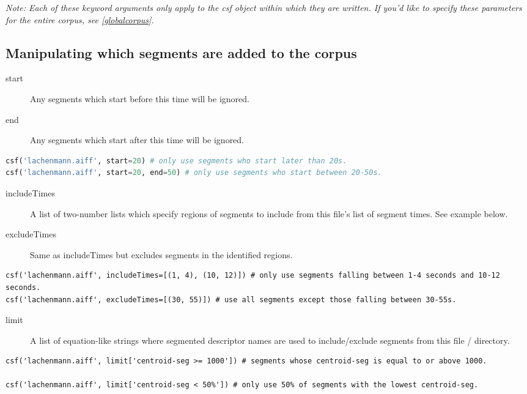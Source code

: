 \documentclass{article}
\begin{document}
\begin{spacing}{1.2}
\emph{Note: Each of these keyword arguments only apply to the csf object within which they are written.  If you'd like to specify these parameters for the entire corpus, see \ref{globalcorpus}.}

\subsection{Manipulating which segments are added to the corpus}
\begin{description}
\item[start] Any segments which start before this time will be ignored.
\item[end] Any segments which start after this time will be ignored.
\end{description}

\begin{lstlisting}[language=python]
csf('lachenmann.aiff', start=20) # only use segments who start later than 20s.
csf('lachenmann.aiff', start=20, end=50) # only use segments who start between 20-50s.
\end{lstlisting}

\begin{description}
\item[includeTimes] A list of two-number lists which specify regions of segments to include from this file's list of segment times.  See example below.
\item[excludeTimes] Same as includeTimes but excludes segments in the identified regions.
\end{description}

\begin{lstlisting}
csf('lachenmann.aiff', includeTimes=[(1, 4), (10, 12)]) # only use segments falling between 1-4 seconds and 10-12 seconds.
csf('lachenmann.aiff', excludeTimes=[(30, 55)]) # use all segments except those falling between 30-55s.
\end{lstlisting}

\begin{description}
\item[limit] A list of equation-like strings where segmented descriptor names are used to include/exclude segments from this file / directory.
\end{description}
\begin{lstlisting}
csf('lachenmann.aiff', limit['centroid-seg >= 1000']) # segments whose centroid-seg is equal to or above 1000.

csf('lachenmann.aiff', limit['centroid-seg < 50%']) # only use 50% of segments with the lowest centroid-seg.


\end{lstlisting}
\end{spacing}
\end{document}
